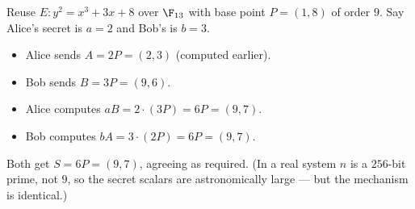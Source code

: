 \begin{example}
\label{ch21:ecdh-toy}
Reuse $E: y^2 = x^3+3x+8$ over $\F_{13}$ with base point $P=(1,8)$ of order $9$. Say
Alice's secret is $a=2$ and Bob's is $b=3$.
\begin{itemize}
  \item Alice sends $A = 2P = (2,3)$ (computed earlier).
  \item Bob sends $B = 3P = (9,6)$.
  \item Alice computes $aB = 2\cdot(3P) = 6P = (9,7)$.
  \item Bob computes $bA = 3\cdot(2P) = 6P = (9,7)$.
\end{itemize}
Both get $S = 6P = (9,7)$, agreeing as required. (In a real system $n$ is a $256$-bit
prime, not $9$, so the secret scalars are astronomically large --- but the mechanism is
identical.)
\end{example}

